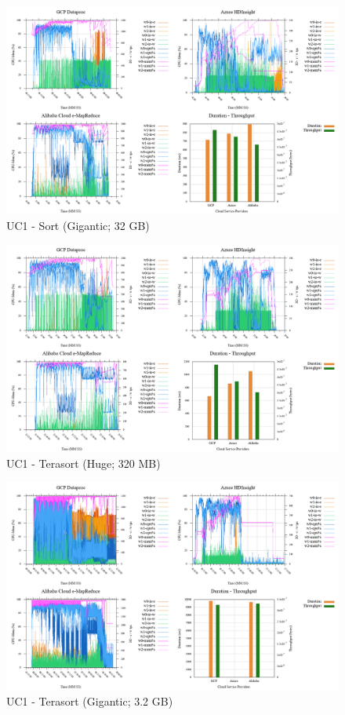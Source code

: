 \documentclass[review]{elsarticle}
\begin{document}
\begin{figure}[b]
	\caption{UC1 - Sort (Gigantic; 32 GB)}
	\label{fig:uc1-srt-g-cmidt}
	\includegraphics[width=\textwidth]{uc1-srt-g-cmidt}
	\centering
\end{figure}

\begin{figure}[b]
	\caption{UC1 - Terasort (Huge; 320 MB)}
	\label{fig:uc1-tera-h-cmidt}
	\includegraphics[width=\textwidth]{uc1-tera-h-cmidt}
	\centering
\end{figure}

\begin{figure}[b]
	\caption{UC1 - Terasort (Gigantic; 3.2 GB)}
	\label{fig:uc1-tera-g-cmidt}
	\includegraphics[width=\textwidth]{uc1-tera-g-cmidt}
	\centering
\end{figure}
\end{document}
